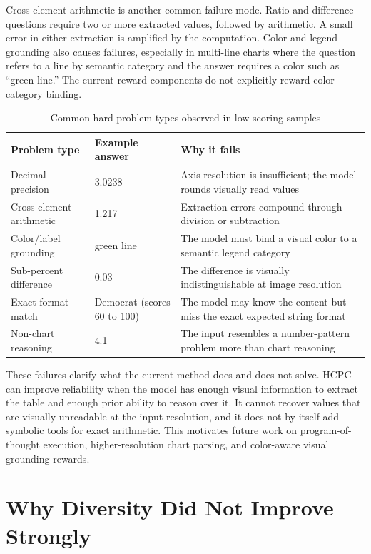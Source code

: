 \documentclass{iutbscthesis}
\begin{document}
Cross-element arithmetic is another common failure mode. Ratio and difference questions require two or more extracted values, followed by arithmetic. A small error in either extraction is amplified by the computation. Color and legend grounding also causes failures, especially in multi-line charts where the question refers to a line by semantic category and the answer requires a color such as ``green line.'' The current reward components do not explicitly reward color-category binding.

\begin{table}[H]
    \centering
    \begin{tabular}{p{3.4cm}p{3cm}p{5.3cm}}
        \toprule
        Problem type & Example answer & Why it fails \\
        \midrule
        Decimal precision & 3.0238 & Axis resolution is insufficient; the model rounds visually read values \\
        Cross-element arithmetic & 1.217 & Extraction errors compound through division or subtraction \\
        Color/label grounding & green line & The model must bind a visual color to a semantic legend category \\
        Sub-percent difference & 0.03 & The difference is visually indistinguishable at image resolution \\
        Exact format match & Democrat (scores 60 to 100) & The model may know the content but miss the exact expected string format \\
        Non-chart reasoning & 4.1 & The input resembles a number-pattern problem more than chart reasoning \\
        \bottomrule
    \end{tabular}
    \caption{Common hard problem types observed in low-scoring samples}
    \label{tab:hard_problem_types}
\end{table}

These failures clarify what the current method does and does not solve. HCPC can improve reliability when the model has enough visual information to extract the table and enough prior ability to reason over it. It cannot recover values that are visually unreadable at the input resolution, and it does not by itself add symbolic tools for exact arithmetic. This motivates future work on program-of-thought execution, higher-resolution chart parsing, and color-aware visual grounding rewards.

\section{Why Diversity Did Not Improve Strongly}
\end{document}

